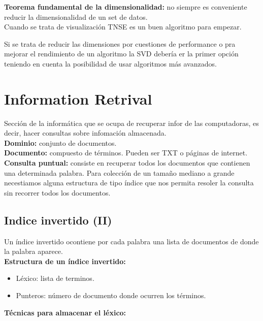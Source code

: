 \documentclass[titlepage,a4paper]{article}
\begin{document}
\textbf{Teorema fundamental de la dimensionalidad:} no siempre es conveniente reducir la dimensionalidad de un set de datos. \\

Cuando se trata de visualización TNSE es un buen algoritmo para empezar. 

Si se trata de reducir las dimensiones por cuestiones de performance o pra mejorar el rendimiento de un algoritmo la SVD debería er la primer opción teniendo en cuenta la posibilidad de usar algoritmos más avanzados. \\


\section*{Information Retrival}

Sección de la informática que se ocupa de recuperar infor de las computadoras, es decir, hacer consultas sobre infomación almacenada. \\

\textbf{Dominio: } conjunto de documentos. \\
\textbf{Documento:} compuesto de términos. Pueden ser TXT o páginas de internet. \\

\textbf{Consulta puntual:} consiste en recuperar todos los documentos que contienen una determinada palabra. Para colección de un tamaño mediano a grande necestiamos alguna estructura de tipo índice que nos permita resoler la consulta sin recorrer todos los documentos. \\

\subsection*{Indice invertido (II)}

Un índice invertido ocontiene por cada palabra una lista de documentos de donde la palabra aparece. \\

\textbf{Estructura de un índice invertido: }\\
\begin{itemize}
\item Léxico: lista de terminos. 
\item Punteros: número de documento donde ocurren los términos. 
\end{itemize}

\textbf{Técnicas para almacenar el léxico:}\\
\end{document}
